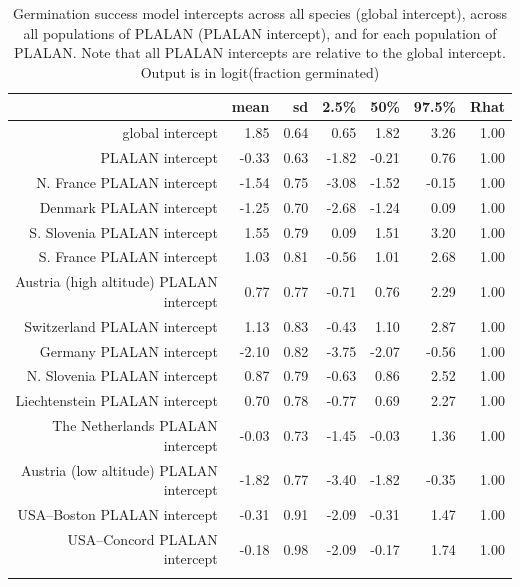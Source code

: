 \documentclass[12pt]{article}\usepackage[]{graphicx}\usepackage[]{color}
\begin{document}
\begin{longtable}{rrrrrrr}
\caption{Germination success model intercepts across all species (global intercept), across all populations of PLALAN (PLALAN intercept), and for each population of PLALAN. Note that all PLALAN intercepts are relative to the global intercept.  Output is in logit(fraction germinated)} \\ 
  & mean & sd & 2.5\% & 50\% & 97.5\% & Rhat \\ 
  \hline
global intercept & 1.85 & 0.64 & 0.65 & 1.82 & 3.26 & 1.00 \\ 
  PLALAN intercept & -0.33 & 0.63 & -1.82 & -0.21 & 0.76 & 1.00 \\ 
  N. France PLALAN intercept & -1.54 & 0.75 & -3.08 & -1.52 & -0.15 & 1.00 \\ 
  Denmark PLALAN intercept & -1.25 & 0.70 & -2.68 & -1.24 & 0.09 & 1.00 \\ 
  S. Slovenia PLALAN intercept & 1.55 & 0.79 & 0.09 & 1.51 & 3.20 & 1.00 \\ 
  S. France PLALAN intercept & 1.03 & 0.81 & -0.56 & 1.01 & 2.68 & 1.00 \\ 
  Austria (high altitude) PLALAN intercept & 0.77 & 0.77 & -0.71 & 0.76 & 2.29 & 1.00 \\ 
  Switzerland PLALAN intercept & 1.13 & 0.83 & -0.43 & 1.10 & 2.87 & 1.00 \\ 
  Germany PLALAN intercept & -2.10 & 0.82 & -3.75 & -2.07 & -0.56 & 1.00 \\ 
  N. Slovenia PLALAN intercept & 0.87 & 0.79 & -0.63 & 0.86 & 2.52 & 1.00 \\ 
  Liechtenstein PLALAN intercept & 0.70 & 0.78 & -0.77 & 0.69 & 2.27 & 1.00 \\ 
  The Netherlands PLALAN intercept & -0.03 & 0.73 & -1.45 & -0.03 & 1.36 & 1.00 \\ 
  Austria (low altitude) PLALAN intercept & -1.82 & 0.77 & -3.40 & -1.82 & -0.35 & 1.00 \\ 
  USA--Boston PLALAN intercept & -0.31 & 0.91 & -2.09 & -0.31 & 1.47 & 1.00 \\ 
  USA--Concord PLALAN intercept & -0.18 & 0.98 & -2.09 & -0.17 & 1.74 & 1.00 \\ 
  \hline
\label{tab:mod_rate_intercept}
\end{longtable}
\end{document}
